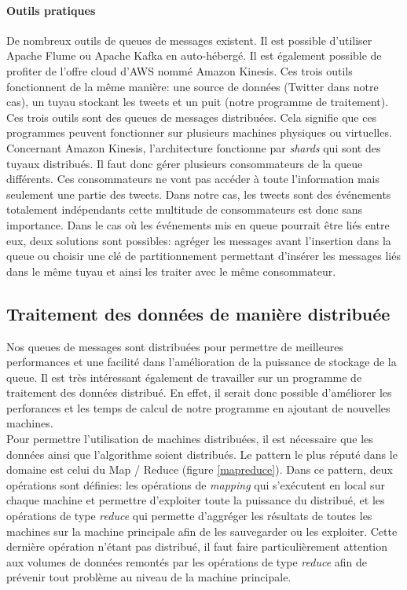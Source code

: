   \paragraph{Outils pratiques}
  \label{par:Outils pratiques}
  De nombreux outils de queues de messages existent. Il est possible d'utiliser Apache Flume ou Apache Kafka en auto-hébergé. Il est également possible de profiter de l'offre cloud d'AWS nommé Amazon Kinesis. Ces trois outils fonctionnent de la même manière: une source de données (Twitter dans notre cas), un tuyau stockant les tweets et un puit (notre programme de traitement).\\

  Ces trois outils sont des queues de messages distribuées. Cela signifie que ces programmes peuvent fonctionner sur plusieurs machines physiques ou virtuelles. Concernant Amazon Kinesis, l'architecture fonctionne par \textit{shards} qui sont des tuyaux distribués. Il faut donc gérer plusieurs consommateurs de la queue différents. Ces consommateurs ne vont pas accéder à toute l'information mais seulement une partie des tweets. Dans notre cas, les tweets sont des événements totalement indépendants cette multitude de consommateurs est donc sans importance. Dans le cas où les événements mis en queue pourrait être liés entre eux, deux solutions sont possibles: agréger les messages avant l'insertion dans la queue ou choisir une clé de partitionnement permettant d'insérer les messages liés dans le même tuyau et ainsi les traiter avec le même consommateur.

\subsection{Traitement des données de manière distribuée}
\label{sub:Traitement des données de manière distribuée}

  Nos queues de messages sont distribuées pour permettre de meilleures performances et une facilité dans l'amélioration de la puissance de stockage de la queue. Il est très intéressant également de travailler sur un programme de traitement des données distribué. En effet, il serait donc possible d'améliorer les perforances et les temps de calcul de notre programme en ajoutant de nouvelles machines.\\

  Pour permettre l'utilisation de machines distribuées, il est nécessaire que les données ainsi que l'algorithme soient distribués. Le pattern le plus réputé dans le domaine est celui du Map / Reduce (figure \ref{mapreduce}). Dans ce pattern, deux opérations sont définies: les opérations de \textit{mapping} qui s'exécutent en local sur chaque machine et permettre d'exploiter toute la puissance du distribué, et les opérations de type \textit{reduce} qui permette d'aggréger les résultats de toutes les machines sur la machine principale afin de les sauvegarder ou les exploiter. Cette dernière opération n'étant pas distribué, il faut faire particulièrement attention aux volumes de données remontés par les opérations de type \textit{reduce} afin de prévenir tout problème au niveau de la machine principale.


